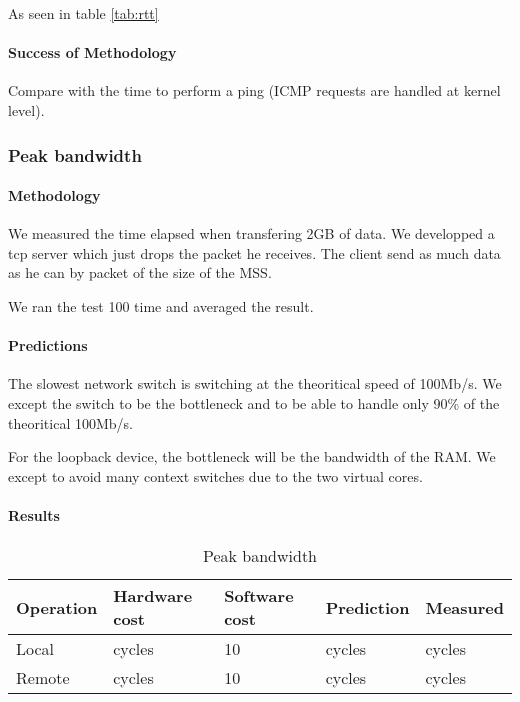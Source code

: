 As seen in table \ref{tab:rtt}
\paragraph{Success of Methodology}

 Compare with the time to perform a ping (ICMP requests are handled at kernel level).






\subsubsection{Peak bandwidth}
\paragraph{Methodology}
We measured the time elapsed when transfering 2GB of data.
We developped a tcp server which just drops the packet he receives.
The client send as much data as he can by packet of the size of the MSS.

We ran the test 100 time and averaged the result.

\paragraph{Predictions}
The slowest network switch is switching at the theoritical speed of 100Mb/s.
We except the switch to be the bottleneck and to be able to handle only 90\% of
the theoritical 100Mb/s.

For the loopback device, the bottleneck will be the bandwidth of the RAM.
We except to avoid many context switches due to the two virtual cores.

\paragraph{Results}
\begin{table}[h]
\begin{center}
\begin{tabular}{| l | l | l | l | l |}
\hline
Operation & Hardware cost & Software cost & Prediction & Measured \\
\hline
Local 	&  cycles		& 10			&  cycles	&  cycles \\
\hline
Remote 	&  cycles		& 10			&  cycles	&  cycles \\
\hline

\end{tabular}
\end{center}
\caption{Peak bandwidth\label{tab:peak-bandwidth}}
\end{table}

